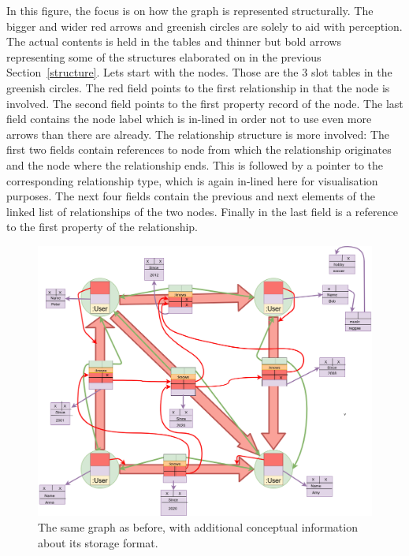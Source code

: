 \documentclass[a4paper,10pt]{article}
\begin{document}
    In this figure, the focus is on how the graph is represented structurally. The bigger and wider red arrows and greenish circles are solely to aid with perception. The actual contents is held in the tables and thinner but bold arrows representing some of the structures elaborated on in the previous Section~\ref{structure}.
    Lets start with the nodes.
    Those are the 3 slot tables in the greenish circles.
    The red field points to the first relationship in that the node is involved. 
    The second field points to the first property record of the node. 
    The last field contains the node label which is in-lined in order not to use even more arrows than there are already.
    The relationship structure is more involved: The first two fields contain references to node from which the relationship originates and the node where the relationship ends.
    This is followed by a pointer to the corresponding relationship type, which is again in-lined here for visualisation purposes.
    The next four fields contain the previous and next elements of the linked list of relationships of the two nodes. 
    Finally in the last field is a reference to the first property of the relationship.\\
    \begin{figure}[htp]\label{example_structs}
        \begin{center}
            \includegraphics[keepaspectratio,height=1.2\textheight,width=1.2\textwidth]{img/04_example/example_structs.png}
        \end{center}
        \caption{The same graph as before, with additional conceptual information about its storage format.}
    \end{figure}
    
\end{document}
